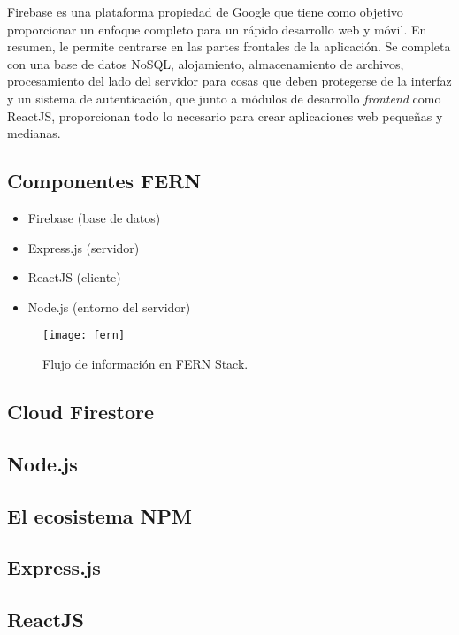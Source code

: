 Firebase es una plataforma propiedad de Google que tiene como objetivo proporcionar un enfoque completo para un rápido desarrollo web y móvil. En resumen, le permite centrarse en las partes frontales de la aplicación. Se completa con una base de datos NoSQL, alojamiento, almacenamiento de archivos, procesamiento del lado del servidor para cosas que deben protegerse de la interfaz y un sistema de autenticación, que junto a módulos de desarrollo \textit{frontend} como ReactJS, proporcionan todo lo necesario para crear aplicaciones web pequeñas y medianas.
\vspace{0.8cm}

\subsection{Componentes FERN}
\begin{itemize}
  \item Firebase (base de datos)
  \item Express.js (servidor)
  \item ReactJS (cliente)
  \item Node.js (entorno del servidor)
\end{itemize}
\begin{figure}[H]
  \centering
  \texttt{[image: fern]}
  \caption{Flujo de información en FERN Stack.}
\end{figure}

\subsection{Cloud Firestore}


\subsection{Node.js}


\subsection{El ecosistema NPM}


\subsection{Express.js}


\subsection{ReactJS}


